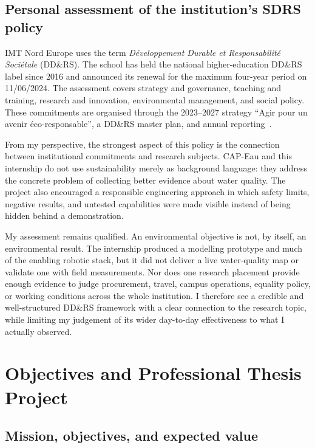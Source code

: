 \documentclass[a4paper,12pt,oneside,openany]{report}
\begin{document}
\section{Personal assessment of the institution's SDRS policy}
IMT Nord Europe uses the term \emph{D\'eveloppement Durable et Responsabilit\'e Soci\'etale}
(DD\&RS). The school has held the national higher-education DD\&RS label since 2016 and announced its
renewal for the maximum four-year period on 11/06/2024. The assessment covers strategy and
governance, teaching and training, research and innovation, environmental management, and social
policy. These commitments are organised through the 2023--2027 strategy ``Agir pour un avenir
\'eco-responsable'', a DD\&RS master plan, and annual
reporting~\cite{imtne2024ddrs,imtne2024ddrsReport}.

From my perspective, the strongest aspect of this policy is the connection between institutional
commitments and research subjects. CAP-Eau and this internship do not use sustainability merely as
background language: they address the concrete problem of collecting better evidence about water
quality. The project also encouraged a responsible engineering approach in which safety limits,
negative results, and untested capabilities were made visible instead of being hidden behind a
demonstration.

My assessment remains qualified. An environmental objective is not, by itself, an environmental
result. The internship produced a modelling prototype and much of the enabling robotic stack, but
it did not deliver a live water-quality map or validate one with field measurements. Nor does one
research placement provide enough evidence to judge procurement, travel, campus operations,
equality policy, or working conditions across the whole institution. I therefore see a credible and
well-structured DD\&RS framework with a clear connection to the research topic, while limiting my
judgement of its wider day-to-day effectiveness to what I actually observed.

\chapter{Objectives and Professional Thesis Project}
\label{chap:project}

\section{Mission, objectives, and expected value}
\end{document}
